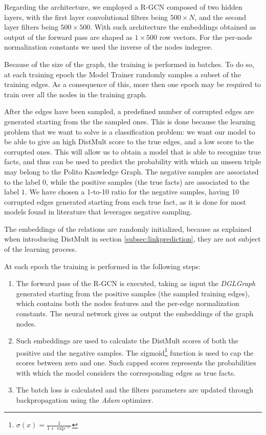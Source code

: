 \documentclass[%
    corpo=13.5pt,
    twoside,
    oldstyle,
    tipotesi=magistrale,
    greek,
    evenboxes
]{toptesi}
\begin{document}
Regarding the architecture, we employed a R-GCN composed of two hidden layers,
with the first layer convolutional filters being $500 \times N$, and the second
layer filters being $500 \times 500$.
With such architecture the embeddings obtained as output of the forward pass
are shaped as $1 \times 500$ row vectors.
For the per-node normalization constants we used the inverse of the nodes
indegree.

Because of the size of the graph, the training is performed in batches.
To do so, at each training epoch the Model Trainer randomly samples a subset
of the training edges.
As a consequence of this, more then one epoch may be required to train over all
the nodes in the training graph.

After the edges have been sampled, a predefined number of corrupted edges are
generated starting from the the sampled ones. This is done because the learning
problem that we want to solve is a classification problem: we want our
model to be able to give an high DistMult score to the true edges, and a
low score to the corrupted ones.
This will allow us to obtain a model that is able to recognize true facts, and
thus can be used to predict the probability with which an unseen triple
may belong to the Polito Knowledge Graph.
The negative samples are associated to the label $0$, while the positive samples
(the true facts) are associated to the label $1$.
We have chosen a 1-to-10 ratio for the negative samples, having 10 corrupted
edges generated starting from each true fact, as it is done for most models
found in literature that leverages negative sampling.

The embeddings of the relations are randomly initialized, because as explained
when introducing DistMult in section \ref{subsec:linkprediction}, they are not
subject of the learning process.

At each epoch the training is performed in the following steps:

\begin{enumerate}
    \item The forward pass of the R-GCN is executed, taking as input the
        \emph{DGLGraph} generated starting from the positive samples
        (the sampled training edges), which contains both
        the nodes features and the per-edge normalization constants.
        The neural network gives as output the embeddings of the graph nodes.
    \item Such embeddings are used to calculate the DistMult scores
        of both the positive and the negative samples.
        The sigmoid\footnote{
            $\sigma(x) = \frac{1}{1+\exp^{-x}}$
        }
        function is used to cap the scores between zero and one. Such capped
        scores represents the probabilities with which the model considers the
        corresponding edges as true facts.
    \item The batch loss is calculated and the filters parameters are updated
        through backpropagation using the \emph{Adam} optimizer.
\end{enumerate}
\end{document}

